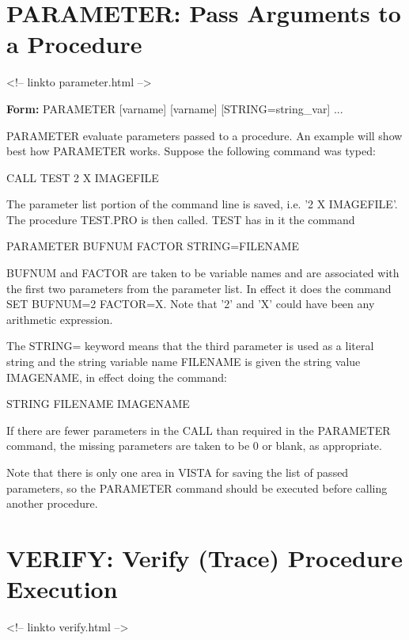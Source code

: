 \section{PARAMETER: Pass Arguments to a Procedure}
\begin{rawhtml}
<!-- linkto parameter.html -->
\end{rawhtml}

\begin{command}
  \item[\textbf{Form: } PARAMETER {[varname]} {[varname]} {[STRING=string\_var]} ...\hfill]{}
\end{command}
PARAMETER evaluate parameters passed to a procedure.  An example will show
best how PARAMETER works.  Suppose the following command was typed:
\begin{hanging}
  \item{CALL TEST 2 X IMAGEFILE}
\end{hanging}
The parameter list portion of the command line is saved, i.e.  '2 X
IMAGEFILE'.  The procedure TEST.PRO is then called.  TEST has in it the
command
\begin{hanging}
  \item{PARAMETER BUFNUM FACTOR STRING=FILENAME}
\end{hanging}
BUFNUM and FACTOR are taken to be variable names and are associated with
the first two parameters from the parameter list.  In effect it does the
command SET BUFNUM=2 FACTOR=X.  Note that '2' and 'X' could have been any
arithmetic expression.

The STRING= keyword means that the third parameter is used as a literal
string and the string variable name FILENAME is given the string value
IMAGENAME, in effect doing the command:
\begin{hanging}
  \item{STRING FILENAME IMAGENAME}
\end{hanging}

If there are fewer parameters in the CALL than required in the PARAMETER
command, the missing parameters are taken to be 0 or blank, as appropriate.

Note that there is only one area in VISTA for saving the list of passed
parameters, so the PARAMETER command should be executed before calling
another procedure.

\section{VERIFY: Verify (Trace) Procedure Execution}
\begin{rawhtml}
<!-- linkto verify.html -->
\end{rawhtml}

